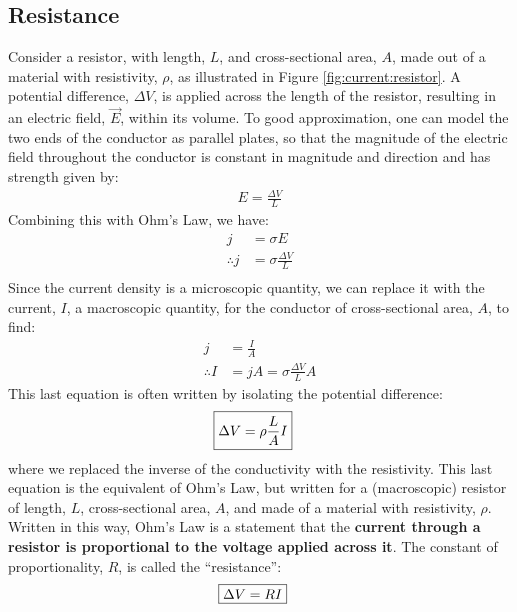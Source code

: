 \subsection{Resistance}
Consider a resistor, with length, $L$, and cross-sectional area, $A$, made out of a material with resistivity, $\rho$, as illustrated in Figure \ref{fig:current:resistor}.
A potential difference, $\Delta V$, is applied across the length of the resistor, resulting in an electric field, $\vec E$, within its volume. To good approximation, one can model the two ends of the conductor as parallel plates, so that the magnitude of the electric field throughout the conductor is constant in magnitude and direction and has strength given by:
\begin{align*}
E=\frac{\Delta V}{L}
\end{align*}
Combining this with Ohm's Law, we have:
\begin{align*}
j&=\sigma E\\
\therefore j&=\sigma\frac{\Delta V}{L}\\
\end{align*}
Since the current density is a microscopic quantity, we can replace it with the current, $I$, a macroscopic quantity, for the conductor of cross-sectional area, $A$, to find:
\begin{align*}
j&=\frac{I}{A}\\
\therefore I&=jA=\sigma\frac{\Delta V}{L}A
\end{align*}
This last equation is often written by isolating the potential difference:
\begin{align*}
\Aboxed{\Delta V = \rho \frac{L}{A} I}
\end{align*}
where we replaced the inverse of the conductivity with the resistivity. This last equation is the equivalent of Ohm's Law, but written for a (macroscopic) resistor of length, $L$, cross-sectional area, $A$, and made of a material with resistivity, $\rho$. Written in this way, Ohm's Law is a statement that the \textbf{current through a resistor is proportional to the voltage applied across it}. The constant of proportionality, $R$, is called the ``resistance'':
\begin{align*}
\Aboxed{\Delta V = RI}
\end{align*}
